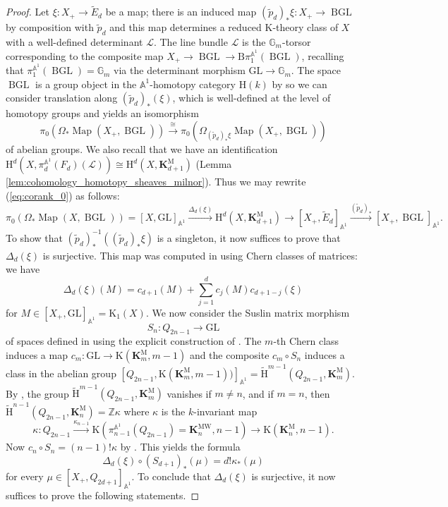 \documentclass[11pt,leqno]{amsart}
\newcommand{\GL}{{\mathrm{GL}}}
\renewcommand{\1}{{\rm 1\hspace*{-0.4ex}%
\rule{0.1ex}{1.52ex}\hspace*{0.2ex}}}
\renewcommand{\Lc}{{\mathcal L}}
\newcommand{\Hr}{{\mathrm {H}}}
\newcommand{\<}[1]{{\langle}#1 {\rangle}}
\newcommand{\Kr}{\mathrm{K}}
\newcommand{\Zb}{\mathbb{Z}}
\newcommand{\Kbf}{\mathbf{K}}
\newcommand{\Abb}{\mathbb{A}}
\newcommand{\BGL}{\operatorname{BGL}}
\newcommand{\Mr}{\mathrm{M}}
\newcommand{\Br}{\mathrm{B}}
\newcommand{\MW}{\mathrm{MW}}
\newcommand{\Map}{\operatorname{Map}}
\theoremstyle{plain}
\theoremstyle{definition}
\theoremstyle{remark}
\numberwithin{equation}{section}
\begin{document}
\begin{proof}
Let $\xi:X_+\to\widetilde{E}_d$ be a map; there is an induced map $(\widetilde{p}_d)_*\xi:X_+\to\BGL$ by composition with $\widetilde{p}_d$ and this map determines a reduced $\Kr$-theory class of $X$ with a well-defined determinant $\Lc$. The line bundle $\Lc$ is the $\mathbb{G}_m$-torsor corresponding to the composite map $X_+\to\BGL\to\Br\pi_1^{\Abb^1}(\BGL)$, recalling that $\pi_1^{\Abb^1}(\BGL)=\mathbb{G}_m$ via the determinant morphism $\GL\to\mathbb{G}_m$. The space $\BGL$ is a group object in the $\Abb^1$-homotopy category $\Hr(k)$ by \cite[Corollary 5.6]{duEnumeratingNonStableVector2022} so we can consider translation along $(\widetilde{p}_d)_*(\xi)$, which is well-defined at the level of homotopy groups and yields an isomorphism \[\pi_0(\Omega_*\Map(X_+,\BGL))\xrightarrow{\cong}\pi_0(\Omega_{(\widetilde{p}_d)_*\xi}\Map(X_+,\BGL))\] of abelian groups. We also recall that we have an identification $\Hr^d(X,\pi_d^{\Abb^1}(F_d)(\Lc))\cong\Hr^d(X,\Kbf_{d+1}^\Mr)$ (Lemma \ref{lem:cohomology_homotopy_sheaves_milnor}). Thus we may rewrite (\ref{eq:corank_0}) as follows: \[\pi_0(\Omega_*\Map(X,\BGL))=[X,\GL]_{\Abb^1}\xrightarrow{\Delta_d(\xi)}\Hr^d(X,\Kbf_{d+1}^\Mr)\to[X_+,\widetilde{E}_d]_{\Abb^1}\xrightarrow{(\widetilde{p}_d)_*}[X_+,\BGL]_{\Abb^1}.\] To show that $(\widetilde{p}_d)_*^{-1}((\widetilde{p}_d)_*\xi)$ is a singleton, it now suffices to prove that $\Delta_d(\xi)$ is surjective. This map was computed in \cite[Proposition 6.3]{duEnumeratingNonStableVector2022} using Chern classes of matrices: we have \[\Delta_d(\xi)(M)=c_{d+1}(M)+\sum_{j=1}^dc_j(M)c_{d+1-j}(\xi)\] for $M\in[X_+,\GL]_{\Abb^1}=\Kr_1(X)$. We now consider the Suslin matrix morphism \[S_{n}:Q_{2n-1}\to\GL\] of spaces defined in \cite[§3.5]{asokAlgebraicVectorBundles2014} using the explicit construction of \cite[§5]{suslinStablyFreeModules1977}. The $m$-th Chern class induces a map $c_m:\GL\rightarrow\Kr(\Kbf_m^\Mr,m-1)$ and the composite $c_m\circ S_n$ induces a class in the abelian group $[Q_{2n-1},\Kr(\Kbf_m^\Mr,m-1))]_{\Abb^1}=\widetilde{\Hr}^{m-1}(Q_{2n-1},\Kbf_m^\Mr)$. By \cite[Lemma 4.5]{asokAlgebraicVectorBundles2014}, the group $\widetilde{\Hr}^{m-1}(Q_{2n-1},\Kbf_m^\Mr)$ vanishes if $m\neq n$, and if $m=n$, then $\widetilde{\Hr}^{n-1}(Q_{2n-1},\Kbf_n^\Mr)=\Zb\kappa$ where $\kappa$ is the $k$-invariant map \[\kappa:Q_{2n-1}\xrightarrow{\kappa_{n-1}}\Kr(\pi_{n-1}^{\Abb^1}(Q_{2n-1})=\Kbf_n^\MW,n-1)\to\Kr(\Kbf_n^\Mr,n-1).\] Now $c_n\circ S_n=(n-1)!\kappa$ by \cite[Remark 6.10]{duEnumeratingNonStableVector2022}. This yields the formula \[\Delta_d(\xi)\circ(S_{d+1})_*(\mu)=d!\kappa_*(\mu)\] for every $\mu\in[X_+,Q_{2d+1}]_{\Abb^1}$. To conclude that $\Delta_d(\xi)$ is surjective, it now suffices to prove the following statements.

\end{proof}
\end{document}
